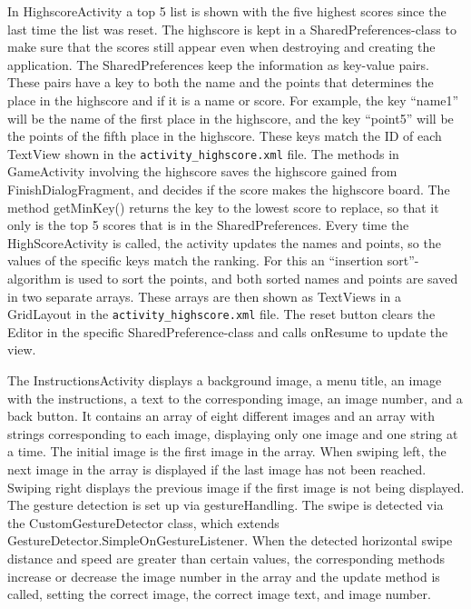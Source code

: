 In HighscoreActivity a top 5 list is shown with the five highest scores since the last time the list was reset. The highscore is kept in a SharedPreferences-class to make sure that the scores still appear even when destroying and creating the application. The SharedPreferences keep the information as key-value pairs. These pairs have a key to both the name and the points that determines the place in the highscore and if it is a name or score. For example, the key “name1” will be the name of the first place in the highscore, and the key “point5” will be the points of the fifth place in the highscore. These keys match the ID of each TextView shown in the \verb|activity_highscore.xml| file. The methods in GameActivity involving the highscore saves the highscore gained from FinishDialogFragment, and decides if the score makes the highscore board. The method getMinKey() returns the key to the lowest score to replace, so that it only is the top 5 scores that is in the SharedPreferences. 
Every time the HighScoreActivity is called, the activity updates the names and points, so the values of the specific keys match the ranking. For this an “insertion sort”-algorithm is used to sort the points, and both sorted names and points are saved in two separate arrays. These arrays are then shown as TextViews in a GridLayout in the \verb|activity_highscore.xml| file.
The reset button clears the Editor in the specific SharedPreference-class and calls onResume to update the view.  \newline

The InstructionsActivity displays a background image, a menu title, an image with the instructions, a text to the corresponding image, an image number, and a back button. It contains an array of eight different images and an array with strings corresponding to each image, displaying only one image and one string at a time. The initial image is the first image in the array. When swiping left, the next image in the array is displayed if the last image has not been reached. Swiping right displays the previous image if the first image is not being displayed. The gesture detection is set up via gestureHandling. The swipe is detected via the CustomGestureDetector class, which extends GestureDetector.SimpleOnGestureListener. When the detected horizontal swipe distance and speed are greater than certain values, the corresponding methods increase or decrease the image number in the array and the update method is called, setting the correct image, the correct image text, and image number. \newline

